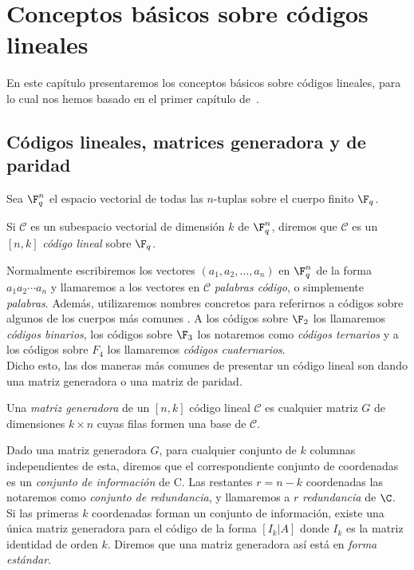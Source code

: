 \chapter{Conceptos básicos sobre códigos lineales}%
\label{chap:conceptos_básicos_sobre_códigos_lineales}

En este capítulo presentaremos los conceptos básicos sobre códigos lineales, para lo cual nos hemos basado en el primer capítulo de~\cite{foecc}.

\section{Códigos lineales, matrices generadora y de paridad}%
\label{sec:códigos_lineales_matrices_generadora_y_de_paridad}

Sea \(\F_q^n\) el espacio vectorial de todas las \(n\)-tuplas sobre el cuerpo finito \(\F_q\).

\begin{definition}
Si \(\mathcal{C}\) es un subespacio vectorial de dimensión \(k\) de \(\F_q^n\), diremos que \(\mathcal{C}\) es un \([n,k]\) \textit{código lineal} sobre \(\F_q\).
\end{definition}

Normalmente escribiremos los vectores \((a_1, a_2, \dots, a_n)\) en \(\F_q^n\) de la forma \(a_1 a_2 \cdots a_n\) y llamaremos a los vectores en \(\mathcal{C}\) \textit{palabras código}, o simplemente \textit{palabras}. Además, utilizaremos nombres concretos para referirnos a códigos sobre algunos de los cuerpos más comunes . A los códigos sobre \(\F_2\) los llamaremos \textit{códigos binarios}, los códigos sobre \(\F_3\) los notaremos como \textit{códigos ternarios} y a los códigos sobre \(F_4\) los llamaremos \textit{códigos cuaternarios}.\\

Dicho esto, las dos maneras más comunes de presentar un código lineal son dando una matriz generadora o una matriz de paridad.

\begin{definition}
    Una \textit{matriz generadora} de un \([n,k]\) código lineal \(\mathcal{C}\) es cualquier matriz \(G\) de dimensiones \(k \times n\) cuyas filas formen una base de \(\mathcal{C}\).
\end{definition}

Dado una matriz generadora \(G\), para cualquier conjunto de \(k\) columnas independientes de esta, diremos que el correspondiente conjunto de coordenadas es un \textit{conjunto de información} de C. Las restantes \(r=n-k\) coordenadas las notaremos como \textit{conjunto de redundancia}, y llamaremos a \(r\) \textit{redundancia} de \(\C\). Si las primeras \(k\) coordenadas forman un conjunto de información, existe una única matriz generadora para el código de la forma \([I_k | A]\) donde \(I_k\) es la matriz identidad de orden \(k\). Diremos que una matriz generadora así está en \textit{forma estándar}.

